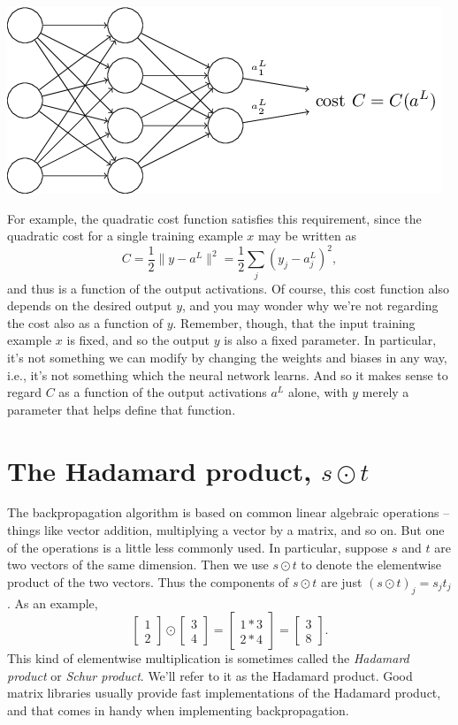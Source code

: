 \documentclass[a4paper,twoside,10pt]{book}
\begin{document}
\begin{center}
\includegraphics[width=0.7\linewidth]{./figures/ch2/tikz18}
\end{center}
For example, the quadratic cost function satisfies this requirement, since the quadratic cost for a single training example $x$ may be written as
\begin{equation}
C = \frac{1}{2} \|y-a^L\|^2 = \frac{1}{2} \sum_j (y_j-a^L_j)^2,
\tag{27}\label{eq:27}
\end{equation}
and thus is a function of the output activations. Of course, this cost function also depends on the desired output $y$, and you may wonder why we're not regarding the cost also as a function of $y$. Remember, though, that the input training example $x$ is fixed, and so the output $y$ is also a fixed parameter. In particular, it's not something we can modify by changing the weights and biases in any way, i.e., it's not something which the neural network learns. And so it makes sense to regard $C$ as a function of the output activations $a^L$ alone, with $y$ merely a parameter that helps define that function.
\section{The Hadamard product, $s\odot{}t$}
The backpropagation algorithm is based on common linear algebraic operations -- things like vector addition, multiplying a vector by a matrix, and so on. But one of the operations is a little less commonly used. In particular, suppose $s$ and $t$ are two vectors of the same dimension. Then we use $s\odot{}t$ to denote the elementwise product of the two vectors. Thus the components of $s\odot{}t$ are just $(s \odot t)_j = s_j t_j$. As an example,
\begin{equation}
	\left[\begin{array}{c} 1 \\ 2 \end{array}\right] 
	\odot \left[\begin{array}{c} 3 \\ 4\end{array} \right]
	= \left[ \begin{array}{c} 1 * 3 \\ 2 * 4 \end{array} \right]
	= \left[ \begin{array}{c} 3 \\ 8 \end{array} \right].
	\tag{28}\label{eq:28}
\end{equation}
This kind of elementwise multiplication is sometimes called the \textit{Hadamard product} or \textit{Schur product}. We'll refer to it as the Hadamard product. Good matrix libraries usually provide fast implementations of the Hadamard product, and that comes in handy when implementing backpropagation.
\end{document}
